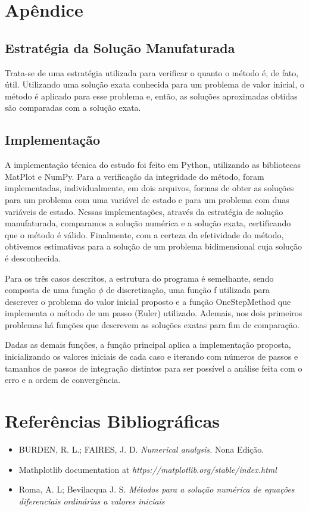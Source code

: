 \documentclass[12pt]{article}
\begin{document}
    \section{Apêndice}
      \subsection{Estratégia da Solução Manufaturada}
      \hspace{0.6cm}Trata-se de uma estratégia utilizada para verificar o quanto o método é, de fato, útil. Utilizando uma solução exata conhecida para um problema de valor inicial, o método é aplicado para esse problema e, então, as soluções aproximadas obtidas são comparadas com a solução exata.

      \subsection{Implementação}
    \hspace{0.7cm}A implementação técnica do estudo foi feito em Python, utilizando as bibliotecas MatPlot e NumPy. Para a verificação da integridade do método, foram implementadas, individualmente, em dois arquivos, formas de obter as soluções para um problema com uma variável de estado e para um problema com duas variáveis de estado. Nessas implementações, através da estratégia de solução manufaturada, comparamos a solução numérica e a solução exata, certificando que o método é válido. Finalmente, com a certeza da efetividade do método, obtivemos estimativas para a solução de um problema bidimensional cuja solução é desconhecida.
    
    \hspace{0.3cm}Para os três casos descritos, a estrutura do programa é semelhante, sendo composta de uma função \(\phi \) de discretização, uma função f utilizada para descrever o problema do valor inicial proposto e a função OneStepMethod que implementa o método de um passo (Euler) utilizado. Ademais, nos dois primeiros problemas há funções que descrevem as soluções exatas para fim de comparação.

    \hspace{0.3cm}Dadas as demais funções, a função principal aplica a implementação proposta, inicializando os valores iniciais de cada caso e iterando com números de passos e tamanhos de passos de integração distintos para ser possível a análise feita com o erro e a ordem de convergência.
\newpage

    \section{Referências Bibliográficas}
    \begin{itemize}
        \item BURDEN, R. L.; FAIRES, J. D. {\itshape Numerical analysis.} Nona Edição.
        \item Mathplotlib documentation at {\itshape https://matplotlib.org/stable/index.html}
        \item Roma, A. L; Bevilacqua J. S. {\itshape Métodos para a solução numérica de equações diferenciais ordinárias a valores iniciais}
    \end{itemize}
\end{document}
